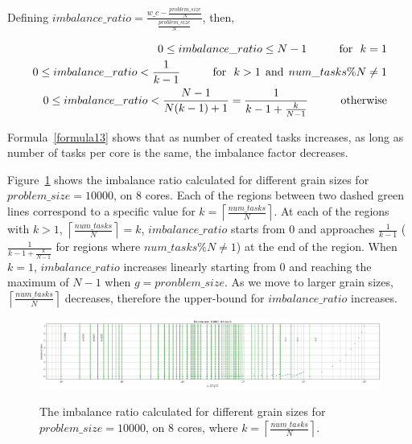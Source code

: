 Defining $imbalance\_{ratio}=\frac{w\_c-\frac{problem\_{size}}{N}}{\frac{problem\_{size}}{N}}$, then,

\begin{equation}\label{formula13}
\begin{aligned}
0\leq{imbalance\_{ratio}}\leq{N-1}  \text{\:\:\:\:\:\:\:\:\:\:\:\:\:for\:\:\:}k={1}\\
0\leq{imbalance\_{ratio}}<\frac{1}{k-1}  \text{\:\:\:\:\:\:\:\:\:\:\:\:\:for\:\:\:}k>{1} \text{\:\:and\:\:}num\_{tasks}\%{N}\neq{1}\\
0\leq{imbalance\_{ratio}}<\frac{N-1}{N(k-1)+1}=\frac{1}{k-1+\frac{k}{N-1}}\text{\:\:\:\:\:\:\:\:\:\:\:\:\:otherwise}
\end{aligned}
\end{equation}

Formula~\ref{formula13} shows that as number of created tasks increases, as long as number of tasks per core is the same, the imbalance factor decreases. 

\vspace{\baselineskip}

Figure~\ref{fig38} shows the imbalance ratio calculated for different grain sizes for $problem\_size=10000$, on 8 cores. Each of the regions between two dashed green lines correspond to a specific value for $k=\left\lceil{\frac{num\_{tasks}}{N}}\right \rceil$. 
At each of the regions with $k>1$, $\left\lceil{\frac{num\_{tasks}}{N}}\right \rceil=k$,  $imbalance\_{ratio}$ starts from $0$ and approaches $\frac{1}{k-1}$ ($\frac{1}{k-1+\frac{k}{N-1}}$ for regions where $num\_{tasks}\%{N}\neq{1}$) at the end of the region. When $k=1$, $imbalance\_{ratio}$ increases linearly starting from 0 and reaching the maximum of $N-1$ when $g=pronblem\_{size}$. As we move to larger grain sizes, $\left\lceil{\frac{num\_{tasks}}{N}}\right \rceil$ decreases, therefore the upper-bound for $imbalance\_{ratio}$ increases.   


\vspace{\baselineskip}	
\begin{figure}[H]
	\centering
	{\includegraphics[scale=.25]{images/hpx_for_loop/w_c_all.png}}
	\caption{The imbalance ratio calculated for different grain sizes for $problem\_size=10000$, on 8 cores, where $k=\left\lceil{\frac{num\_{tasks}}{N}}\right \rceil$.}\label{fig38}		
\end{figure}



